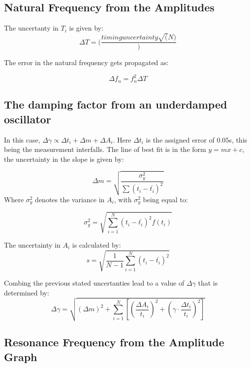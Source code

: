 \subsection{Natural Frequency from the Amplitudes} \label{appendix:errors:fn_amplitude}

The uncertanty in $T_i$ is given by:
\begin{equation}
  \Delta T = (\frac{timing uncertainty\sqrt(N )})
\end{equation}

The error in the natural frequency gets propagated as:

\begin{equation}
  \Delta f_n = f_n^2\Delta T 
\end{equation}

\subsection{The damping factor from an underdamped oscillator}
In this case, $\Delta \gamma \propto \Delta t_i +\Delta m + \Delta A_i$. Here $\Delta t_i$ is the assigned error of $0.05$s, this being the measurement interfalls. The line of best fit is in the form $y=mx+c$, the uncertainty in the slope is given by:

\begin{equation*}
  \Delta m = \sqrt{\frac{\sigma_y^2}{\sum (t_i - \bar{t_i})^2}}
\end{equation*}
Where $\sigma_y^2$ denotes the variance in $A_i$, with $\sigma_y^2$ being equal to:

\begin{equation*}
\sigma_y^2 = \sqrt{\sum_{i=1}^{N} {(t_i - \bar{t_i})^2}{f(t_i)}}
\end{equation*}

The uncertainty in $A_i$ is calculated by:
\begin{equation*}
  s = \sqrt{\frac{1}{N-1}\sum_{i = 1}^{N}(t_i - \bar{t_i})^2}
\end{equation*}

Combing the previous stated uncertanties lead to a value of $\Delta \gamma$ that is determined by:
\begin{equation*}
  \Delta \gamma = \sqrt{(\Delta m)^2 + \sum_{i=1}^{N} \left[ \left( \frac{\Delta A_i}{t_i} \right)^2 + \left( \gamma \cdot \frac{\Delta t_i}{t_i} \right)^2 \right]}
\end{equation*}

\subsection{ Resonance Frequency from the Amplitude Graph } \label{appendix:errors:res_ampl}

